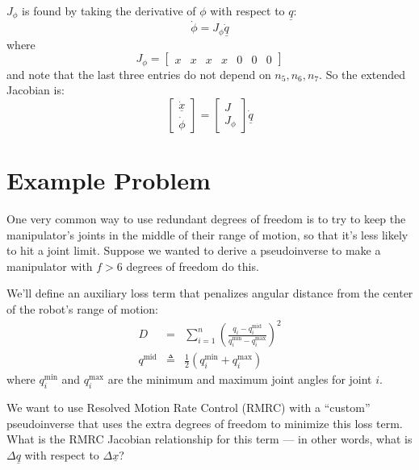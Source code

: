 \documentclass[]{article}
\begin{document}
$J_{\phi}$ is found by taking the derivative of $\phi$ with respect to $\underline{q}$:
\begin{displaymath}
 \dot{\phi} = J_{\phi}\dot{\underline{q}}
\end{displaymath}
where
\begin{displaymath}
 J_{\phi} = \left[ \begin{array}{ccccccc} x & x & x & x & 0 & 0 & 0 \end{array}\right]
\end{displaymath}
and note that the last three entries do not depend on $n_{5}, n_{6}, n_{7}$. So the extended Jacobian is:
\begin{equation}
 \left[ \begin{array}{c} \dot{\underline{x}} \\ \dot{\phi} \end{array} \right] = \left[ \begin{array}{c} J \\ J_{\phi} \end{array} \right] \dot{\underline{q}}
\end{equation}

\section{Example Problem}

One very common way to use redundant degrees of freedom is to try to keep the manipulator's joints in the middle of their range of motion, so that it's less likely to hit a joint limit. Suppose we wanted to derive a pseudoinverse to make a manipulator with $f>6$ degrees of freedom do this.

We'll define an auxiliary loss term that penalizes angular distance from the center of the robot's range of motion:
\begin{eqnarray}
D & = & \sum_{i=1}^{n} \left( \frac{q_{i}-q_{i}^{\mathrm{mid}}}{q_{i}^{\mathrm{min}}-q_{i}^{\mathrm{max}}}\right)^{2} \\
q^{\mathrm{mid}} & \triangleq & \frac{1}{2}\left( q_{i}^{\mathrm{min}} + q_{i}^{\mathrm{max}} \right)
\end{eqnarray}
where $q_{i}^{\mathrm{min}}$ and $q_{i}^{\mathrm{max}}$ are the minimum and maximum joint angles for joint $i$.
 
 We want to use Resolved Motion Rate Control (RMRC) with a ``custom'' pseudoinverse that uses the extra degrees of freedom to minimize this loss term. What is the RMRC Jacobian relationship for this term --- in other words, what is $\Delta \underline{q}$ with respect to $\Delta\underline{x}$?
\end{document}
